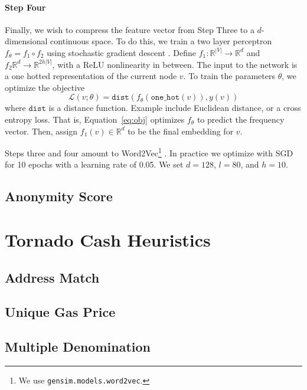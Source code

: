 \documentclass[11pt,a4paper]{article}
\begin{document}
\paragraph{Step Four} Finally, we wish to compress the feature vector from Step Three to a $d$-dimensional continuous space. To do this, we train a two layer perceptron $f_\theta = f_1 \circ f_2$ using stochastic gradient descent \citep{goodfellow2016deep,kingma2014adam}. Define $f_1: \mathbb{R}^{|V|} \rightarrow \mathbb{R}^d$ and $f_2 \mathbb{R}^d \rightarrow \mathbb{R}^{2h|V|}$, with a ReLU nonlinearity in between. The input to the network is a one hotted representation of the current node $v$.
To train the parameters $\theta$, we optimize the objective
\begin{equation}
  \mathcal{L}(v; \theta) = \texttt{dist}(f_\theta(\texttt{one\_hot}(v)), y(v))
  \label{eq:obj}
\end{equation}
where $\texttt{dist}$ is a distance function. Example include Euclidean distance, or a cross entropy loss.
That is, Equation~\ref{eq:obj} optimizes $f_\theta$ to predict the frequency vector. Then, assign $f_1(v) \in \mathbb{R}^d$ to be the final embedding for $v$.\newline

Steps three and four amount to Word2Vec\footnote{We use \texttt{gensim.models.word2vec}.} \citep{mikolov2013efficient,mikolov2013distributed}. In practice we optimize with SGD for 10 epochs with a learning rate of 0.05. We set $d = 128$, $l = 80$, and $h = 10$.

\subsection{Anonymity Score}
\label{sec:anonymityscore}

\section{Tornado Cash Heuristics}
\label{sec:tornado}

\subsection{Address Match}

\subsection{Unique Gas Price}

\subsection{Multiple Denomination}
\end{document}
